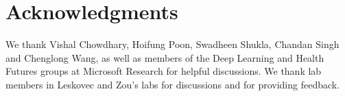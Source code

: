 \section*{Acknowledgments}
We thank 
Vishal Chowdhary,
Hoifung Poon,
Swadheen Shukla, 
Chandan Singh
and 
Chenglong Wang, as well as members of the Deep Learning and Health Futures groups at Microsoft Research for helpful discussions. We thank lab members in Leskovec and Zou’s labs for discussions and for providing feedback.

